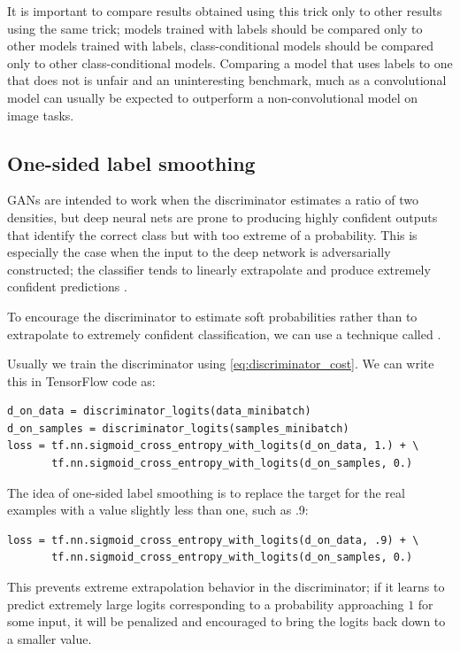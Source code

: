  It is important to compare results obtained using this trick only to other
 results using the same trick; models trained with labels should be compared
 only to other models trained with labels, class-conditional models should
 be compared only to other class-conditional models.
 Comparing a model that uses labels to one that does not is unfair and an
 uninteresting benchmark, much as a convolutional model can usually be expected
 to outperform a non-convolutional model on image tasks.

\subsection{One-sided label smoothing}
\label{sec:label_smooth}

GANs are intended to work when the discriminator estimates a ratio of two
densities, but deep neural nets are prone to producing highly confident
outputs that identify the correct class but with too extreme of a probability.
This is especially the case when the input to the deep network is adversarially
constructed; the classifier tends to linearly extrapolate and produce
extremely confident predictions \citep{Goodfellow-2015-adversarial}.

To encourage the discriminator to estimate soft probabilities rather than
to extrapolate to extremely confident classification, we can use a technique
called  \citep{salimans2016improved}.

Usually we train the discriminator using \eqref{eq:discriminator_cost}.
We can write this in TensorFlow \citep{tensorflow} code as:
\begin{lstlisting}
d_on_data = discriminator_logits(data_minibatch)
d_on_samples = discriminator_logits(samples_minibatch)
loss = tf.nn.sigmoid_cross_entropy_with_logits(d_on_data, 1.) + \
       tf.nn.sigmoid_cross_entropy_with_logits(d_on_samples, 0.)
\end{lstlisting}

The idea of one-sided label smoothing is to replace the target for the real examples
with a value slightly less than one, such as .9:

\begin{lstlisting}
loss = tf.nn.sigmoid_cross_entropy_with_logits(d_on_data, .9) + \
       tf.nn.sigmoid_cross_entropy_with_logits(d_on_samples, 0.)
\end{lstlisting}

This prevents extreme extrapolation behavior in the discriminator; if it learns
to predict extremely large logits corresponding to a probability approaching $1$
for some input, it will be penalized and encouraged to bring the logits back
down to a smaller value.

